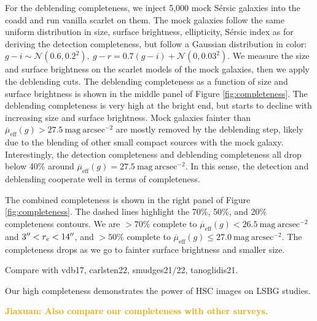 \documentclass[twocolumn,astrosymb,twocolappendix]{aastex631}
\newcommand{\sbunit}{\mathrm{mag\ arcsec}^{-2}}
\newcommand{\sbeff}{\overline{\mu}_{\mathrm{eff}}(g)}
\newcommand{\jiaxuan}[1]{\textcolor{orange}{\textbf{Jiaxuan: #1}}}
\newcommand{\sersic}{S\'ersic}
\begin{document}
\begin{CJK*}{UTF8}{gbsn}
For the deblending completeness, we inject 5,000 mock \sersic{} galaxies into the coadd and run vanilla scarlet on them. The mock galaxies follow the same uniform distribution in size, surface brightness, ellipticity, \sersic{} index as for deriving the detection completeness, but follow a Gaussian distribution in color: $g-i \sim \mathcal{N}(0.6, 0.2^2),\ g-r = 0.7 (g-i) + \mathcal{N}(0, 0.03^2)$. We measure the size and surface brightness on the scarlet models of the mock galaxies, then we apply the deblending cuts. The deblending completeness as a function of size and surface brightness is shown in the middle panel of Figure \ref{fig:completeness}. The deblending completeness is very high at the bright end, but starts to decline with increasing size and surface brightness. Mock galaxies fainter than $\sbeff > 27.5\ \sbunit$ are mostly removed by the deblending step, likely due to the blending of other small compact sources with the mock galaxy. Interestingly, the detection completeness and deblending completeness all drop below 40\% around $\sbeff=27.5\ \sbunit$. In this sense, the detection and deblending cooperate well in terms of completeness. 

The combined completeness is shown in the right panel of Figure \ref{fig:completeness}. The dashed lines highlight the 70\%, 50\%, and 20\% completeness contours. We are $>70\%$ complete to $\sbeff < 26.5\ \sbunit$ and $3\mbox{$^{\prime\prime}$} < r_e < 14\mbox{$^{\prime\prime}$}$, and $>50\%$ complete to $\sbeff \leqslant 27.0\ \sbunit$. The completeness drops as we go to fainter surface brightness and smaller size. 

Compare with vdb17, carlsten22, smudges21/22, tanoglidis21.

Our high completeness demonstrates the power of HSC images on LSBG studies. 

\jiaxuan{Also compare our completeness with other surveys.}



\end{CJK*}
\end{document}
